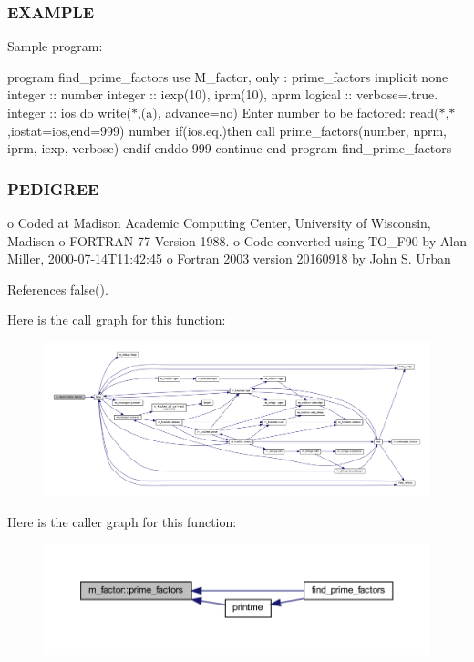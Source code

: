  \subsubsection*{E\+X\+A\+M\+P\+LE}

Sample program\+:

program find\+\_\+prime\+\_\+factors use M\+\_\+factor, only \+: prime\+\_\+factors implicit none integer \+:\+: number integer \+:\+: iexp(10), iprm(10), nprm logical \+:\+: verbose=.true. integer \+:\+: ios do write($\ast$,\textquotesingle{}(a)\textquotesingle{}, advance=\textquotesingle{}no\textquotesingle{}) \textquotesingle{} Enter number to be factored\+: \textquotesingle{} read($\ast$,$\ast$,iostat=ios,end=999) number if(ios.\+eq.)then call prime\+\_\+factors(number, nprm, iprm, iexp, verbose) endif enddo 999 continue end program find\+\_\+prime\+\_\+factors

\subsubsection*{P\+E\+D\+I\+G\+R\+EE}

o Coded at Madison Academic Computing Center, University of Wisconsin, Madison o F\+O\+R\+T\+R\+AN 77 Version 1988. o Code converted using T\+O\+\_\+\+F90 by Alan Miller, 2000-\/07-\/14\+T11\+:42\+:45 o Fortran 2003 version 20160918 by John S. Urban 

References false().

Here is the call graph for this function\+:
\nopagebreak
\begin{figure}[H]
\begin{center}
\leavevmode
\includegraphics[width=350pt]{namespacem__factor_a6440013d17b820fa65096b34f21d367d_cgraph}
\end{center}
\end{figure}
Here is the caller graph for this function\+:
\nopagebreak
\begin{figure}[H]
\begin{center}
\leavevmode
\includegraphics[width=350pt]{namespacem__factor_a6440013d17b820fa65096b34f21d367d_icgraph}
\end{center}
\end{figure}


